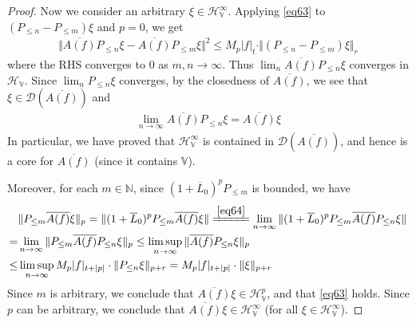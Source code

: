 \documentclass[12pt,b5paper,notitlepage]{article}
\theoremstyle{definition}
\theoremstyle{plain}
\newcommand{\ovl}{\overline}
\newcommand{\Dom}{\scr{D}}
\newcommand{\scr}{\mathscr}
\newcommand{\Vbb}{\mathbb V}
\newcommand{\Nbb}{\mathbb N}
\newcommand{\HV}{\mathcal H_{\mathbb V}}
\numberwithin{equation}{section}
\begin{document}
\begin{proof}
Now we consider an arbitrary $\xi\in\HV^\infty$. Applying \eqref{eq63} to $(P_{\leq n}-P_{\leq m})\xi$ and $p=0$, we get 
\begin{align*}
\Vert  \ovl{A(f)}P_{\leq n}\xi-\ovl{A(f)}P_{\leq m}\xi\Vert^2\leq M_p|f|_t\cdot\Vert (P_{\leq n}-P_{\leq m})\xi\Vert_r
\end{align*}
where the RHS converges to $0$ as $m,n\rightarrow\infty$. Thus $\lim_n \ovl{A(f)}P_{\leq n}\xi$ converges in $\HV$. Since $\lim_n P_{\leq n}\xi$ converges, by the closedness of $\ovl{A(f)}$, we see that $\xi\in\Dom(\ovl{A(f)})$ and
\begin{align*}
\lim_{n\rightarrow\infty} \ovl{A(f)}P_{\leq n}\xi=\ovl{A(f)}\xi \tag{$\triangle$} \label{eq64}
\end{align*}
In particular, we have proved that $\HV^\infty$ is contained in $\Dom(\ovl{A(f)})$, and hence is a core for $\ovl{A(f)}$ (since it contains $\Vbb$). 

Moreover,  for each $m\in\Nbb$, since $ (1+{\ovl L_0})^pP_{\leq m}$ is bounded, we have
\begin{align*}
&\Vert P_{\leq m}\ovl{A(f)}\xi\Vert_p=\Vert (1+{\ovl L_0})^pP_{\leq m}\ovl{A(f)}\xi\Vert\xlongequal{\eqref{eq64}}\lim_{n\rightarrow\infty}\Vert (1+{\ovl L_0})^pP_{\leq m}\ovl{A(f)}P_{\leq n}\xi\Vert\\
=&\lim_{n\rightarrow\infty}\Vert P_{\leq m}\ovl{A(f)}P_{\leq n}\xi\Vert_p\leq \limsup_{n\rightarrow\infty}\Vert \ovl{A(f)}P_{\leq n}\xi\Vert_p\\
\leq& \limsup_{n\rightarrow\infty}M_p|f|_{t+|p|}\cdot \Vert P_{\leq n}\xi\Vert_{p+r}= M_p|f|_{t+|p|}\cdot \Vert \xi\Vert_{p+r}
\end{align*}
Since $m$ is arbitrary, we conclude that $\ovl{A(f)}\xi\in \HV^p$, and that \eqref{eq63} holds. Since $p$ can be arbitrary, we conclude that $\ovl{A(f)}\xi\in\HV^\infty$ (for all $\xi\in\HV^\infty$).
\end{proof}


\subsection{}
\end{document}
